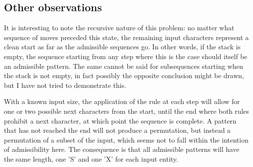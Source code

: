 \documentclass{article}
\begin{document}
\subsection*{Other observations}

It is interesting to note the recursive nature of this problem: no matter what sequence of moves preceded this state, the remaining input characters represent a clean start as far as the admissible sequences go.  In other words, if the stack is empty, the sequence starting from any step where this is the case should itself be an admissible pattern.  The same cannot be said for subsequences starting when the stack is not empty, in fact possibly the opposite conclusion might be drawn, but I have not tried to demonstrate this.

With a known input size, the application of the rule at each step will allow for one or two possible next characters from the start, until the end where both rules prohibit a next character, at which point the sequence is complete.  A pattern that has not reached the end will not produce a permutation, but instead a permutation of a subset of the input, which seems not to fall within the intention of admissibility here.  The consequence is that all admissible patterns will have the same length, one 'S' and one 'X' for each input entity.
\end{document}

